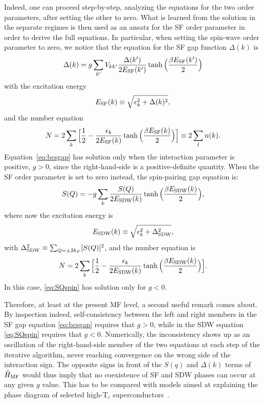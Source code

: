 \documentclass[pra,aps,superscriptaddress,twocolumn]{revtex4}
\begin{document}
Indeed, one can proceed step-by-step, analyzing the equations for the two order parameters, after setting the other to zero.
What is learned from the solution in the separate regimes is then used as an ansatz for the SF
order parameter in order to derive the full equations. In particular, when setting the spin-wave order parameter to zero,
we notice that the equation for the SF gap function $\Delta(k)$ is
\begin{equation}
\Delta(k)=g\sum_{k'}V_{kk'}\frac{\Delta(k')}{2E_{\rm SF}(k')}\tanh\Big(\frac{\beta E_{\rm SF}(k')}{2}\Big)
\label{eq:bcsgap}
\end{equation}
with the excitation energy
\begin{equation}
E_{\rm SF}(k)\equiv\sqrt{\epsilon_{k}^2+\Delta(k)^2},
\label{eq:excbcs}
\end{equation}
and the number equation
\begin{equation}
N=2\sum_k\Big[\frac{1}{2}-\frac{\epsilon_k}{2E_{\rm SF}(k)}\tanh\Big(\frac{\beta E_{\rm SF}(k)}{2}\Big)\Big]\equiv 2\sum_l n(k).
\label{eq:bcsnumber}
\end{equation}
Equation~\eqref{eq:bcsgap} has solution only when the interaction parameter is positive, $g>0$, since the right-hand-side is a positive-definite quantity.
When the SF order parameter is set to zero instead, the spin-pairing gap equation is:
\begin{equation}
S(Q)=-g\sum_k\frac{S(Q)}{2E_{\rm SDW}(k)}\tanh\Big(\frac{\beta E_{\rm SDW}(k)}{2}\Big),
\label{eq:SQspin}
\end{equation}
where now the excitation energy is
\begin{equation}
E_{\rm SDW}(k)\equiv\sqrt{\epsilon_k^2+\Delta_{\rm SDW}^2},
\label{eq:excspin}
\end{equation}
with $\Delta_{\rm SDW}^2\equiv \sum_{Q=\pm 2k_F} [S(Q)]^2$,
and the number equation is
\begin{equation}
N=2\sum_k \Big[\frac{1}{2}-\frac{\epsilon_k}{2E_{\rm SDW}(k)}\tanh\Big(\frac{\beta E_{\rm SDW}(k)}{2}\Big)\Big].
\label{eq:spinnumber}
\end{equation}
In this case, \eqref{eq:SQspin} has solution only for $g<0$.

Therefore, at least at the present MF level, a second useful remark comes about. By inspection indeed, self-consistency between the left and right members
in the SF gap equation \eqref{eq:bcsgap} requires that $g>0$, while in the SDW equation \eqref{eq:SQspin} requires that  $g<0$. Numerically, the inconsistency shows
up as an oscillation of the right-hand-side member of the two equations at each step of the iterative algorithm, never reaching convergence on the wrong side of the
interaction sign. The opposite signs in front of the $S(q)$ and $\Delta(k)$ terms of $\hat H_{\rm MF}$ would thus imply that no coexistence of SF and SDW phases can
occur at any given $g$ value. This has to be compared with models aimed at explaining the phase diagram of selected high-T$_c$
superconductors~\cite{reviewhtsc, Desta2016}.
\end{document}

